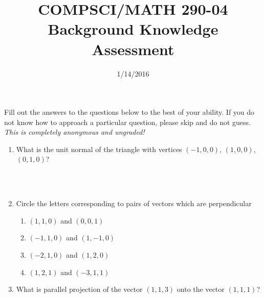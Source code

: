 \documentclass{article}
\title{COMPSCI/MATH 290-04 Background Knowledge Assessment }
\date{1/14/2016}
\begin{document}
\begin{spacing}{1.1}

\maketitle

Fill out the answers to the questions below to the best of your ability.  If you do not know how to approach a particular question, please skip and do not guess.  {\em This is completely anonymous and ungraded!}

\begin{enumerate}

\item %

What is the unit normal of the triangle with vertices $(-1, 0, 0)$, $(1, 0, 0)$, $(0, 1, 0)$?
\begin{description}
\item[] \leavevmode \\ \\ 
\end{description}

\item %

Circle the letters corresponding to pairs of vectors which are perpendicular

\begin{enumerate}[label=\alph*.]

\item %

$(1, 1, 0)$ and $(0, 0, 1)$

\item

$(-1, 1, 0)$ and $(1, -1, 0)$ %

\item 

$(-2, 1, 0)$ and $(1, 2, 0)$ %

\item

$(1, 2, 1)$ and $(-3, 1, 1)$ %

\end{enumerate}

\item
What is parallel projection of the vector $(1, 1, 3)$ onto the vector $(1, 1, 1)$?  %

\begin{description}
\item[] \leavevmode \\ \\ \\ \\
\end{description}


\end{enumerate}
\end{spacing}
\end{document}
